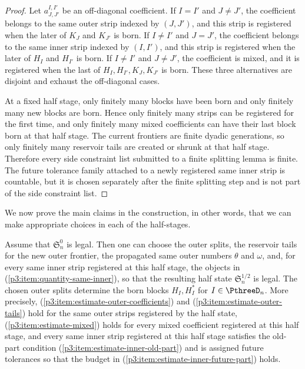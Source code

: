 \documentclass[11pt,reqno]{amsart}
\makeatletter
\theoremstyle{plain}
\theoremstyle{definition}
\newcounter{problempaper}
\newenvironment{problempaperbody}{%
  \setcounter{subsection}{0}%
  \setcounter{subsubsection}{0}%
  \setcounter{paragraph}{0}%
  \renewcommand{\thesubsection}{\arabic{subsection}}%
  \renewcommand{\thesubsubsection}{\thesubsection.\arabic{subsubsection}}%
  \renewcommand{\theparagraph}{\thesubsubsection.\arabic{paragraph}}%
  \let\problem@outersection\section
  \let\problem@outersubsection\subsection
  \let\problem@outersubsubsection\subsubsection
  \let\problem@outerparagraph\paragraph
  \let\section\problem@papersection
  \let\subsection\problem@papersubsection
  \let\subsubsection\problem@papersubsubsection
}{%
  \let\section\problem@outersection
  \let\subsection\problem@outersubsection
  \let\subsubsection\problem@outersubsubsection
  \let\paragraph\problem@outerparagraph
}
\newcommand{\problem@target}[2]{%
  \hypertarget{problem-\theproblempaper-#1-#2}{}%
}
\newcommand{\problem@paperheading}[3]{%
  \par\bigskip
  \problem@target{#1}{#2}%
  \noindent{\large\bfseries #2.\quad #3\par}%
  \nobreak\smallskip
}
\newcommand{\problem@papersubheading}[3]{%
  \par\medskip
  \problem@target{#1}{#2}%
  \noindent{\normalsize\bfseries #2.\quad #3\par}%
  \nobreak\smallskip
}
\newcommand{\problem@papersubsubheading}[3]{%
  \par\smallskip
  \problem@target{#1}{#2}%
  \noindent{\normalsize\itshape #2.\quad #3.\ }%
}
\def\problem@papersection{%
  \@ifstar{\problem@papersectionstar}{\problem@papersectionnostar}%
}
\def\problem@papersectionstar#1{%
  \par\bigskip\noindent{\large\bfseries #1\par}\nobreak\smallskip
}
\def\problem@papersectionnostar#1{%
  \refstepcounter{subsection}%
  \setcounter{subsubsection}{0}%
  \setcounter{paragraph}{0}%
  \problem@paperheading{section}{\thesubsection}{#1}%
  \problem@writecontentsline{section}{\thesubsection}{#1}%
}
\def\problem@papersubsection{%
  \@ifstar{\problem@papersubsectionstar}{\problem@papersubsectionnostar}%
}
\def\problem@papersubsectionstar#1{%
  \par\medskip\noindent{\normalsize\bfseries #1\par}\nobreak\smallskip
}
\def\problem@papersubsectionnostar#1{%
  \refstepcounter{subsubsection}%
  \setcounter{paragraph}{0}%
  \problem@papersubheading{subsection}{\thesubsubsection}{#1}%
  \problem@writecontentsline{subsection}{\thesubsubsection}{#1}%
}
\def\problem@papersubsubsection{%
  \@ifstar{\problem@papersubsubsectionstar}{\problem@papersubsubsectionnostar}%
}
\def\problem@papersubsubsectionstar#1{%
  \par\smallskip\noindent{\normalsize\itshape #1.\ }%
}
\def\problem@papersubsubsectionnostar#1{%
  \refstepcounter{paragraph}%
  \problem@papersubsubheading{subsubsection}{\theparagraph}{#1}%
  \problem@writecontentsline{subsubsection}{\theparagraph}{#1}%
}
\newcommand{\problem@writecontentsline}[3]{%
  \begingroup
  \protected@write\@auxout{}{%
    \string\problemcontentsentry{\theproblempaper}{#1}{#2}{#3}{\thepage}%
  }%
  \endgroup
}
\newcommand{\problemcontentsentry}[5]{%
  \@ifundefined{problemcontents@#1}{%
    \expandafter\gdef\csname problemcontents@#1\endcsname{}%
  }{}%
  \expandafter\g@addto@macro\csname problemcontents@#1\endcsname{%
    \problemcontentsline{#1}{#2}{#3}{#4}{#5}%
  }%
}
\newcommand{\problemcontentslink}[4]{%
  \hyperlink{problem-#1-#2-#3}{#4}%
}
\newcommand{\problemcontentsline}[5]{%
  \ifstrequal{#2}{section}{%
    \par\noindent
    \problemcontentslink{#1}{#2}{#3}{\makebox[2.5em][l]{#3}#4}%
    \nobreak\dotfill
    \problemcontentslink{#1}{#2}{#3}{#5}\par
  }{%
    \ifstrequal{#2}{subsection}{%
      \par\noindent\hspace*{1.5em}%
      \problemcontentslink{#1}{#2}{#3}{\makebox[3.5em][l]{#3}#4}%
      \nobreak\dotfill
      \problemcontentslink{#1}{#2}{#3}{#5}\par
    }{%
      \par\noindent\hspace*{3em}%
      \problemcontentslink{#1}{#2}{#3}{\makebox[4.5em][l]{#3}#4}%
      \nobreak\dotfill
      \problemcontentslink{#1}{#2}{#3}{#5}\par
    }%
  }%
}
\makeatother
\begin{document}
\begin{problempaperbody}
\begin{proof}
Let $a_{J,J'}^{I,I'}$ be an off-diagonal coefficient. If $I=I'$ and $J\ne J'$, the coefficient belongs to the same outer strip indexed by $(J,J')$, and this strip is registered when the later of $K_J$ and $K_{J'}$ is born. If $I\ne I'$ and $J=J'$, the coefficient belongs to the same inner strip indexed by $(I,I')$, and this strip is registered when the later of $H_I$ and $H_{I'}$ is born. If $I\ne I'$ and $J\ne J'$, the coefficient is mixed, and it is registered when the last of $H_I,H_{I'},K_J,K_{J'}$ is born. These three alternatives are disjoint and exhaust the off-diagonal cases.

At a fixed half stage, only finitely many blocks have been born and only finitely many new blocks are born. Hence only finitely many strips can be registered for the first time, and only finitely many mixed coefficients can have their last block born at that half stage. The current frontiers are finite dyadic generations, so only finitely many reservoir tails are created or shrunk at that half stage. Therefore every side constraint list submitted to a finite splitting lemma is finite. The future tolerance family attached to a newly registered same inner strip is countable, but it is chosen separately after the finite splitting step and is not part of the side constraint list.
\end{proof}

We now prove the main claims in the construction, in other words, that we can make appropriate choices in each of the half-stages.

\begin{p3claim}
\label{p3:claim:outer-half-stage}
Assume that $\mathfrak S_n^0$ is legal. Then one can choose the outer splits, the reservoir tails for the new outer frontier, the propagated same outer numbers $\theta$ and $\omega$, and, for every same inner strip registered at this half stage, the objects in \textup{(\ref{p3:item:quantity-same-inner})}, so that the resulting half state $\mathfrak S_n^{1/2}$ is legal. The chosen outer splits determine the born blocks $H_I,H_I^*$ for $I\in\PthreeD_n$. More precisely, \textup{(\ref{p3:item:estimate-outer-coefficients})} and \textup{(\ref{p3:item:estimate-outer-tails})} hold for the same outer strips registered by the half state, \textup{(\ref{p3:item:estimate-mixed})} holds for every mixed coefficient registered at this half stage, and every same inner strip registered at this half stage satisfies the old-part condition \textup{(\ref{p3:item:estimate-inner-old-part})} and is assigned future tolerances so that the budget in \textup{(\ref{p3:item:estimate-inner-future-part})} holds.
\end{p3claim}


\end{problempaperbody}
\end{document}

